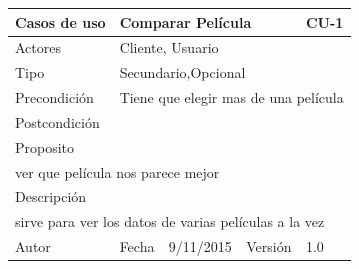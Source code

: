 \documentclass{article}
\begin{document}
\begin{table}[h]
\begin{tabular}{|l|l|l|l|l|l|}
\hline
\multicolumn{2}{|p{2cm}|}{Casos de uso}  & \multicolumn{3}{p{7cm}|}{Comparar Película} & CU-1 \\
\hline
\multicolumn{2}{|p{2cm}|}{Actores}       & \multicolumn{4}{p{8cm}|}{Cliente, Usuario}        \\
\hline
\multicolumn{2}{|p{2cm}|}{Tipo}          & \multicolumn{4}{p{8cm}|}{Secundario,Opcional}        \\
\hline
\multicolumn{2}{|p{2cm}|}{Precondición}  & \multicolumn{4}{p{8cm}|}{Tiene que elegir mas de una película}        \\
\hline
\multicolumn{2}{|p{2cm}|}{Postcondición} & \multicolumn{4}{p{8cm}|}{}        \\
\hline
\multicolumn{6}{|p{10cm}|}{Proposito}                                   \\
\hline
\multicolumn{6}{|p{10cm}|}{ver que película nos parece mejor}                                            \\
\hline
\multicolumn{6}{|p{10cm}|}{Descripción}                                 \\
\hline
\multicolumn{6}{|p{10cm}|}{sirve para ver los datos de varias películas a la vez}                                            \\
\hline
Autor              &              & Fecha   & 9/11/2015     &   Versión  &1.0\\
\hline
\end{tabular}
\end{table}
\end{document}
